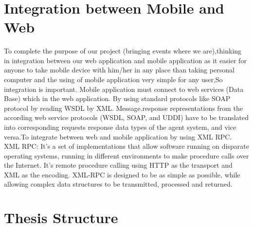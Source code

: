 \documentclass[12pt,a4paper,class,twoside,openany]{report}
\begin{document}
\section{Integration between Mobile and Web}
\paragraph*{\hspace{.9 cm} } To complete the purpose of our project (bringing events where we are),thinking in integration between our web application  and mobile application as it easier for anyone to take mobile device with him/her in any place than taking personal computer and  the using of mobile application very simple for any user,So integration is important. Mobile application must connect to web services (Data Base) which in the web application. By using standard protocols like SOAP protocol by reading WSDL by XML. Message.response representations from the according web service protocols (WSDL, SOAP, and UDDI) have to be translated into corresponding requests response data types of the agent system, and vice versa.To integrate between web and mobile application by using XML RPC.
 XML RPC: It's a set of implementations that allow software running on disparate operating systems, running in different environments to make procedure calls over the Internet.
It's remote procedure calling using HTTP as the transport and XML as the encoding. XML-RPC is designed to be as simple as possible, while allowing complex data structures to be transmitted, processed and returned.


\section{Thesis Structure}
\end{document}
